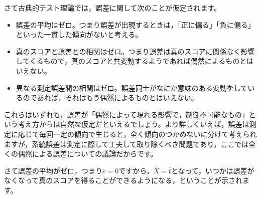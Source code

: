 \documentclass{ltjsbook}
\begin{document}
さて古典的テスト理論では，誤差に関して次のことが仮定されます。
\begin{itemize}
	\item 誤差の平均はゼロ。つまり誤差が出現するときは，「正に偏る」「負に偏る」といった一貫した傾向がないと考える。
	\item 真のスコアと誤差との相関はゼロ。つまり誤差は真のスコアに関係なく影響してくるもので，真のスコアと共変動するようであれば偶然によるものとはいえない。
	\item 異なる測定誤差間の相関はゼロ。誤差同士がなにか意味のある変動をしているのであれば，それはもう偶然によるものとはいえない。
\end{itemize}

これらはいずれも，誤差が「偶然によって現れる影響で，制御不可能なもの」という考え方からは自然な仮定だといえるでしょう。より詳しくいえば，誤差は測定に応じて毎回一定の傾向で生じると，全く傾向のつかめないに分けて考えられますが，系統誤差は測定に際して工夫して取り除くべき問題であり，ここでは全くの偶然による誤差についての議論だからです。

さて誤差の平均がゼロ，つまり$\bar{e}=0$ですから，$\bar{X}=\bar{t}$となって，いつかは誤差がなくなって真のスコアを得ることができるようになる，ということが示されます。
\end{document}
